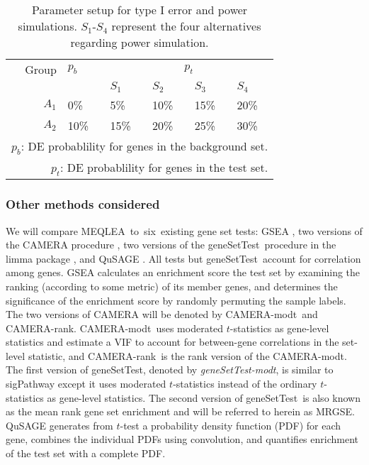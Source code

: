 \documentclass[useAMS,usenatbib, galley]{biom}
\newcommand{\OurMethod}{MEQLEA}
\newcommand{\HowmanyTest}{six}
\newcommand{\CMR}{CAMERA-rank}
\newcommand{\CMT}{CAMERA-modt}
\newcommand{\gent}{geneSetTest-modt}
\newcommand{\gen}{geneSetTest}
\begin{document}
		
		\begin{table}[!ht]
			\centering
			\caption{Parameter setup for type I error and power simulations. $S_1$-$S_4$ represent the four alternatives regarding power simulation.}
			\begin{tabular}{rp{1cm}p{1cm}p{1cm}p{1cm}p{1cm}}
				\hline\hline
				Group & $p_b$ &  \multicolumn{4}{c}{$p_t$}  \\ 
				\cline{3-6}
				&   & $S_1$ & $S_2$ & $S_3$ & $S_4$\\ 
				\hline
				$A_1$ & 0\%   & 5\% & 10\% & 15\% & 20\%\\ 
				$A_2$ & 10\%  & 15\%& 20\%& 25\% & 30\%\\ 
				\hline\hline
				\multicolumn{6}{p{8cm}}{$p_b$: DE probablility for genes in the background set. }	 \\	
				\multicolumn{6}{p{8cm}}{$p_t$: DE probablility for genes in the test set. }	 \\	
			\end{tabular}
			\label{table:simusetup}
		\end{table}
	
		\subsubsection{Other methods considered}
		
		We will compare \OurMethod~to~\HowmanyTest~existing gene set tests: GSEA \citep{subramanian2005gene}, two versions of the CAMERA procedure \citep{wu2012camera}, two versions of the \gen~procedure in the limma package \citep{smyth2005limma}, and QuSAGE \citep{yaari2013quantitative}. All tests but \gen~account for correlation among genes. GSEA calculates an enrichment score the test set by examining the ranking (according to some metric) of its member genes, and determines the significance of the enrichment score by randomly permuting the sample labels. The two versions of CAMERA will be denoted by \CMT~and \CMR. \CMT~uses moderated $t$-statistics \citep{Smyth2004moderated} as gene-level statistics and estimate a VIF to account for between-gene correlations in the set-level statistic, and \CMR~is the rank version of the \CMT. The first version of \gen, denoted by \textit{\gent}, is similar to sigPathway \citep{tian2005discovering} except it uses moderated $t$-statistics instead of the ordinary $t$-statistics as gene-level statistics. The second version of \gen~is also known as the mean rank gene set enrichment \citep{michaud2008integrative} and will be referred to herein as MRGSE. QuSAGE generates from $t$-test a probability density function (PDF) for each gene, combines the individual PDFs using convolution, and quantifies enrichment of the test set with a complete PDF. 
		
\end{document}
